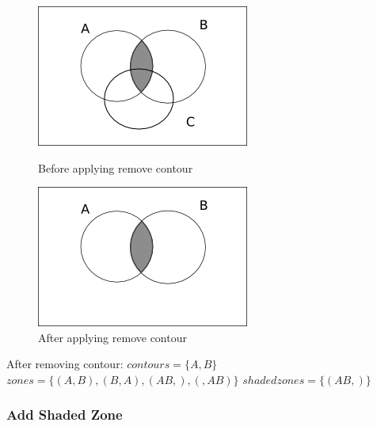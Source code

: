\documentclass[a4paper]{article}
\begin{document}
\begin{figure}[h]
\begin{minipage}[h]{0.5\linewidth}
\centering
\includegraphics[scale=0.5]{images/diag3add2.png}
\caption{Before applying remove contour}
\label{fig:add3}
\end{minipage}
\hspace{0.5cm}
\begin{minipage}[h]{0.5\linewidth}
\centering
\includegraphics[scale=0.5]{images/diag3add1.png}
\caption{After applying remove contour}
\label{fig:add4}
\end{minipage}
\end{figure}

After removing contour:\newline
$contours =  \lbrace A, B \rbrace $ \newline
$zones = \lbrace (A , B) , (B , A), (AB , ) , ( , AB) \rbrace  $ \newline 
$shaded zones = \lbrace (AB , ) \rbrace  $ \newline

\subsubsection{Add Shaded Zone}
\end{document}

